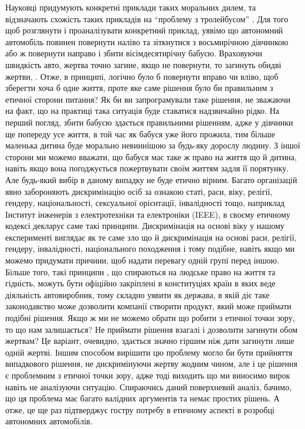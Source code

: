 Науковці придумують конкретні приклади таких моральних дилем, та відзначають схожість таких прикладів на \foreignquote{ukrainian}{проблему з тролейбусом} \cite{thomson1986trolley}. Для того щоб розглянути і проаналізувати конкретний приклад, уявімо що автономний автомобіль повинен повернути наліво та зіткнутися з восьмирічною дівчинкою або ж повернути направо і збити вісімдесятирічну бабусю. Враховуючи швидкість авто, жертва точно загине, якщо не повернути, то загинуть обидві жертви, \cite{lin2016ethics}. Отже, в принципі, логічно було б повернути вправо чи вліво, щоб зберегти хоча б одне життя, проте яке саме рішення було би правильним з етичної сторони питання? Як би ви запрограмували таке рішення, не зважаючи на факт, що на практиці така ситуація буде ставатися надзвичайно рідко. На перший погляд, збити бабусю здається правильними рішенням, адже у дівчинки ще попереду усе життя, в той час як бабуся уже його прожила, тим більше маленька дитина буде морально невиннішою за будь-яку дорослу людину. З іншої сторони ми можемо вважати, що бабуся має таке ж право на життя що й дитина, навіть якщо вона погоджується пожертвувати своїм життям задля її порятунку. Але будь-який вибір в даному випадку не буде етично вірним. Багато організацій явно забороняють дискримінацію осіб за ознакою статі, раси, віку, релігії, гендеру, національності, сексуальної орієнтації, інвалідності тощо, наприклад Інститут інженерів з електротехніки та електроніки (IEEE), в своєму етичному кодексі \cite{ieee} декларує саме такі принципи. Дискримінація на основі віку у нашому експерименті виглядає як те саме зло що й дискримінація на основі раси, релігії, гендеру, інвалідності, національного походження і тому подібне, навіть якщо ми можемо придумати причини, щоб надати перевагу одній групі перед іншою. Більше того, такі принципи , що спираються на людське право на життя та гідність, можуть бути офіційно закріплені в конституціях країн в яких веде діяльність автовиробник, тому складно уявити як держава, в якій діє таке законодавство може дозволити компанії створити продукт, який може приймати подібні рішення. Якщо ж ми не можемо обрати що робити з етичної точки зору, то що нам залишається? Не приймати рішення взагалі і дозволити загинути обом жертвам? Це варіант, очевидно, здається значно гіршим ніж дати загинути лише одній жертві. Іншим способом вирішити цю проблему могло би бути прийняття випадкового рішення, не дискримінуючи жертву жодним чином, але і це рішення є проблемним з етичної точки зору, адже тоді виходить що ми виносимо вирок навіть не аналізуючи ситуацію. Спираючись даний поверхневий аналіз, бачимо, що ця проблема має багато валідних аргументів та немає простих рішень. А отже, це ще раз підтверджує гостру потребу в етичному аспекті в розробці автономних автомобілів. 

